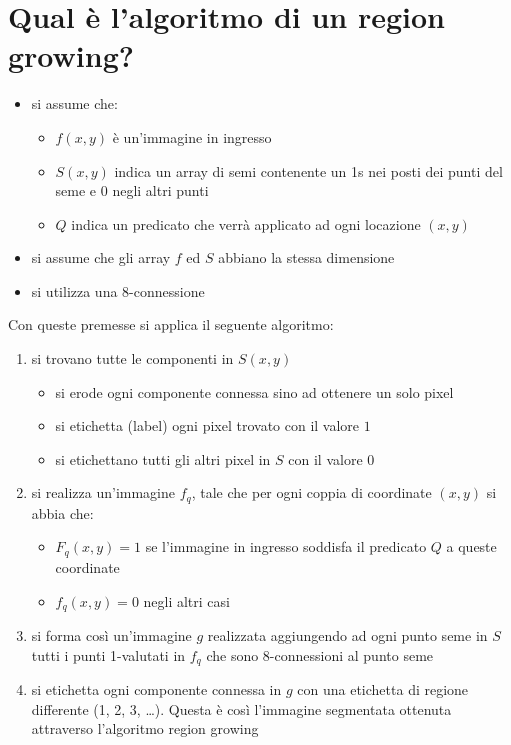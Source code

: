 \section{Qual è l'algoritmo di un region growing?}

\begin{itemize}
	\item si assume che:

\begin{itemize}
	\item $f(x, y)$ è un'immagine in ingresso
	\item $S(x, y)$ indica un array di semi contenente un 1s nei posti dei punti del seme e 0 negli altri punti
	\item $Q$ indica un predicato che verrà applicato ad ogni locazione $(x, y)$
\end{itemize}

	\item si assume che gli array $f$ ed $S$ abbiano la stessa dimensione
	\item si utilizza una 8-connessione
\end{itemize}

Con queste premesse si applica il seguente algoritmo:

\begin{enumerate}
	\item si trovano tutte le componenti in $S(x, y)$
	
	\begin{itemize}
		\item si erode ogni componente connessa sino ad ottenere un solo pixel
		\item si etichetta (label) ogni pixel trovato con il valore $1$
		\item si etichettano tutti gli altri pixel in $S$ con il valore $0$
	\end{itemize}
	
	\item si realizza un'immagine $f_q$, tale che per ogni coppia di coordinate $(x, y)$ si abbia che:
	
		\begin{itemize}
			\item $F_q(x, y) = 1$ se l'immagine in ingresso soddisfa il predicato $Q$ a queste coordinate
			\item $f_q(x, y) = 0$ negli altri casi
		\end{itemize}
		
		\item si forma così un'immagine $g$ realizzata aggiungendo ad ogni punto seme in $S$ tutti i punti 1-valutati in $f_q$ che sono 8-connessioni al punto seme
		
		\item si etichetta ogni componente connessa in $g$ con una etichetta di regione differente (1, 2, 3, \dots). Questa è così l'immagine segmentata ottenuta attraverso l'algoritmo region growing
\end{enumerate}

